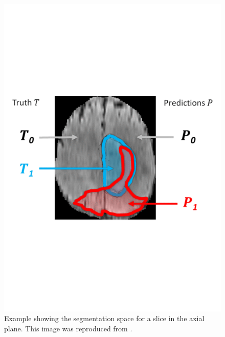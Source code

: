 \documentclass[12pt,a4paper,twoside,openright]{report}
\begin{document}
\begin{figure}[h]
	\centering
	\includegraphics[scale = 0.5]{example_evaluation}
	\caption[Example showing the segmentation space for a slice in the axial plane.]{Example showing the segmentation space for a slice in the axial plane. This image was reproduced from \cite{brats-proceedings}.}	
	\label{fig:evaluation_example}
\end{figure}
\end{document}
